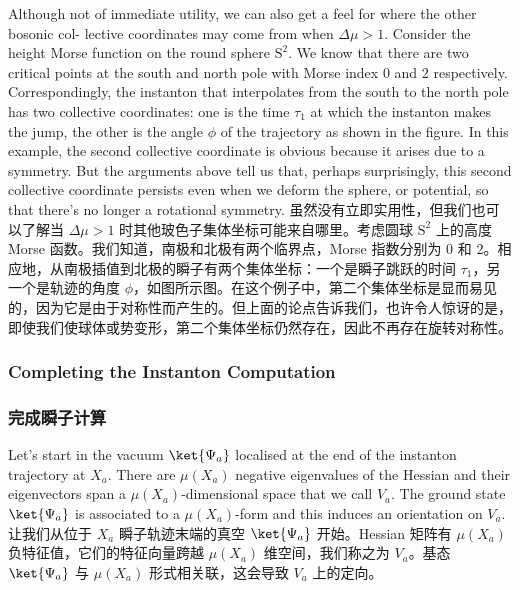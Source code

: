 \documentclass{article}
\begin{document}
\begin{paracol}{2}
Although not of immediate utility, we can also get a feel for where the other bosonic col- lective coordinates may come from when $\Delta \mu >1$. Consider the height Morse function on the round sphere $\bm{\mathrm{S}}^2$. We know that there are two critical points at the south and north pole with Morse index $0$ and $2$ respectively. Correspondingly, the instanton that interpolates from the south to the north pole has two collective coordinates: one is the time $\tau_1$ at which the instanton makes the jump, the other is the angle $\phi$ of the trajectory as shown in the figure. In this example, the second collective coordinate is obvious because it arises due to a symmetry. But the arguments above tell us that, perhaps surprisingly, this second collective coordinate persists even when we deform the sphere, or potential, so that there’s no longer a rotational symmetry.
\switchcolumn
虽然没有立即实用性，但我们也可以了解当 $\Delta \mu >1$ 时其他玻色子集体坐标可能来自哪里。考虑圆球 $\bm{\mathrm{S}}^2$ 上的高度 Morse 函数。我们知道，南极和北极有两个临界点，Morse 指数分别为 $0$ 和 $2$。相应地，从南极插值到北极的瞬子有两个集体坐标：一个是瞬子跳跃的时间 $\tau_1$，另一个是轨迹的角度 $\phi$，如图所示图。在这个例子中，第二个集体坐标是显而易见的，因为它是由于对称性而产生的。但上面的论点告诉我们，也许令人惊讶的是，即使我们使球体或势变形，第二个集体坐标仍然存在，因此不再存在旋转对称性。
\switchcolumn*

\subsubsection{Completing the Instanton Computation}
\switchcolumn
\subsubsection*{完成瞬子计算}
\switchcolumn*

Let’s start in the vacuum $\ket{\Psi_a}$ localised at the end of the instanton trajectory at $X_a$. There are $\mu(X_a)$ negative eigenvalues of the Hessian and their eigenvectors span a $\mu(X_a)$-dimensional space that we call $V_a$. The ground state $\ket{\Psi_a}$ is associated to a $\mu(X_a)$-form and this induces an orientation on $V_a$.
\switchcolumn
让我们从位于 $X_a$ 瞬子轨迹末端的真空 $\ket{\Psi_a}$ 开始。Hessian 矩阵有 $\mu(X_a)$ 负特征值，它们的特征向量跨越 $\mu(X_a)$ 维空间，我们称之为 $V_a$。基态 $\ket{\Psi_a}$ 与 $\mu(X_a)$ 形式相关联，这会导致 $V_a$ 上的定向。
\switchcolumn*


\end{paracol}
\end{document}
